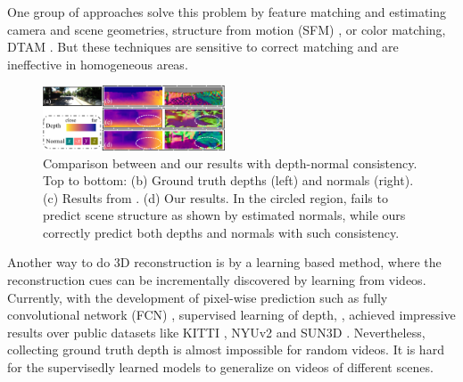 One group of approaches solve this problem by feature matching and estimating camera and scene geometries, \eg structure from motion (SFM) \cite{wu2011visualsfm} \etc, or color matching, \eg DTAM \cite{NewcombeLD11}. But these techniques are sensitive to correct matching and are ineffective in homogeneous areas. 
\begin{figure}
\centering
\includegraphics[width=0.48\textwidth, height=0.18\textwidth]{figures/visual_comparison_comp-v2.pdf}
\caption{Comparison between \protect\cite{zhou2017unsupervised} and our results with depth-normal consistency. Top to bottom: (b) Ground truth depths (left) and normals (right). (c) Results from \protect\cite{zhou2017unsupervised}. (d) Our results. In the circled region, \protect\cite{zhou2017unsupervised} fails to predict scene structure as shown by estimated normals, while ours correctly predict both depths and normals with such consistency.}
\vspace{-1.0\baselineskip}
\label{fig:visual_comparison}
\end{figure}
Another way to do 3D reconstruction is by a learning based method, where the reconstruction cues can be incrementally discovered by learning from videos. Currently, with the development of pixel-wise prediction such as fully convolutional network (FCN) \cite{long2015fully}, supervised learning of depth, \eg \cite{eigen2014depth}, achieved impressive results over public datasets like KITTI \cite{geiger2012we}, NYUv2 \cite{silberman2012indoor} and SUN3D \cite{xiao2013sun3d}. 
Nevertheless, collecting ground truth depth is almost impossible for random videos.  It is hard for the supervisedly learned models to generalize on videos of different scenes.

